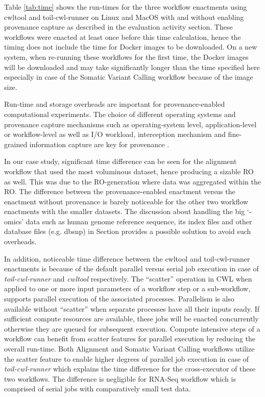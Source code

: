 \documentclass[a4paper,num-refs]{oup-contemporary}
\begin{document}
Table \ref{tab:time} shows the run-times for the three workflow enactments using cwltool and toil-cwl-runner on Linux and MacOS with and without enabling provenance capture as described in the evaluation activity section. These workflows were enacted at least once before this time calculation, hence the timing does not include the time for Docker images to be downloaded. On a new system, when re-running these workflows for the first time, the Docker images will be downloaded and may take significantly longer than the time specified here especially in case of the Somatic Variant Calling workflow because of the image size. 

Run-time and storage overheads are important for provenance-enabled computational experiments. The choice of different operating systems and provenance capture mechanisms such as operating-system level, application-level or workflow-level as well as I/O workload, interception mechanism and fine-grained information capture are key for provenance \citep{Carata2014, kim2016assessing}. 

In our case study, significant time difference can be seen for the alignment workflow that used the most voluminous dataset, hence producing a sizable RO as well. This was due to the RO-generation where data was aggregated within the RO. The difference between the provenance-enabled enactment versus the enactment without provenance is barely noticeable for the other two workflow enactments with the smaller datasets. The discussion about handling the big `-omics' data such as human genome reference sequence, its index files and other database files (e.g. dbsnp) in Section \textbf{} provides a possible solution to avoid such overheads. 

In addition, noticeable time difference between the cwltool and toil-cwl-runner enactments is because of the default parallel versus serial job execution in case of \textit{toil-cwl-runner} and \textit{cwltool} respectively. The ``scatter'' operation in CWL when applied to one or more input parameters of a workflow step or a sub-workflow, supports parallel execution of the associated processes. Parallelism is also available without “scatter” when separate processes have all their inputs ready. If sufficient compute resources are available, these jobs will be enacted concurrently otherwise they are queued for subsequent execution. Compute intensive steps of a workflow can benefit from scatter features for parallel execution by reducing the overall run-time. Both Alignment and Somatic Variant Calling workflows utilize the scatter feature to enable higher degrees of parallel job execution in case of \textit{toil-cwl-runner} which explains the time difference for the cross-executor of these two workflows. The difference is negligible for RNA-Seq workflow which is comprised of serial jobs with comparatively small test data. 
\end{document}

